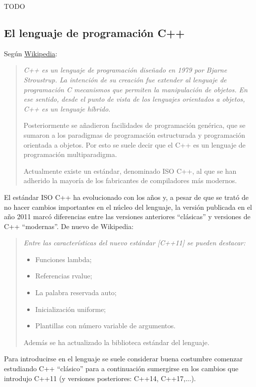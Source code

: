 TODO


\subsection{El lenguaje de programación C++}
\label{sec:el-lenguaje-c++}

Según \href{https://es.wikipedia.org/wiki/C\%2B\%2B}{Wikipedia}:
\begin{quote}\it
  C++ es un lenguaje de programación diseñado en 1979 por Bjarne Stroustrup. La intención de su creación fue extender al lenguaje de programación C mecanismos que permiten la manipulación de objetos. En ese sentido, desde el punto de vista de los lenguajes orientados a objetos, C++ es un lenguaje híbrido.

Posteriormente se añadieron facilidades de programación genérica, que se sumaron a los paradigmas de programación estructurada y programación orientada a objetos. Por esto se suele decir que el C++ es un lenguaje de programación multiparadigma.

Actualmente existe un estándar, denominado ISO C++, al que se han adherido la mayoría de los fabricantes de compiladores más modernos.
\end{quote}

El estándar ISO C++ ha evolucionado con los años y, a pesar de que se trató de no hacer cambios importantes en el núcleo del lenguaje, la versión publicada en el año 2011 marcó diferencias entre las versiones anteriores ``clásicas'' y versiones de C++ ``modernas''. De nuevo de Wikipedia:

\begin{quote}\it
  Entre las características del nuevo estándar [C++11] se pueden destacar:
  \begin{itemize}
  \item Funciones lambda;
  \item Referencias rvalue;
  \item La palabra reservada auto;
  \item Inicialización uniforme;
  \item Plantillas con número variable de argumentos.
  \end{itemize}
  Además se ha actualizado la biblioteca estándar del lenguaje.
\end{quote}
Para introducirse en el lenguaje se suele considerar buena costumbre comenzar estudiando C++ ``clásico'' para a continuación sumergirse en los cambios que introdujo C++11 (y versiones posteriores: C++14, C++17,...).


